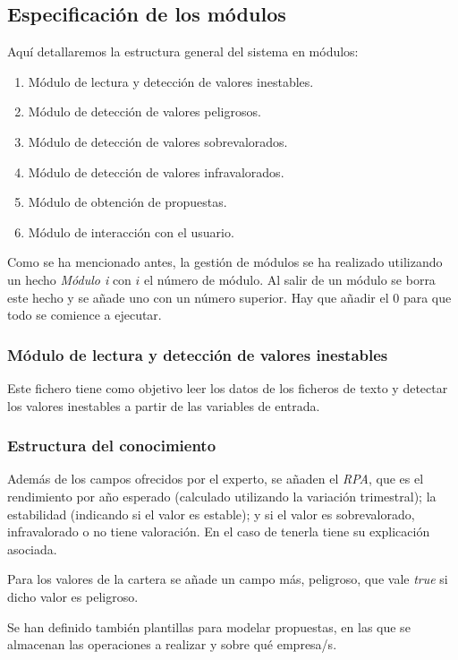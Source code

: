 \documentclass[a4paper, 11pt, titlepage]{article}
\theoremstyle{definition}
\begin{document}
  \subsection{Especificación de los módulos}
  Aquí detallaremos la estructura general del sistema en módulos:

    \begin{enumerate}\addtocounter{enumi}{-1}
        \item Módulo de lectura y detección de valores inestables.
        \item Módulo de detección de valores peligrosos.
        \item Módulo de detección de valores sobrevalorados.
        \item Módulo de detección de valores infravalorados.
        \item Módulo de obtención de propuestas.
        \item Módulo de interacción con el usuario.
    \end{enumerate}

    Como se ha mencionado antes, la gestión de módulos se ha realizado utilizando
    un hecho \emph{Módulo i} con $i$ el número de módulo. Al salir de un módulo
    se borra este hecho y se añade uno con un número superior. Hay que añadir
    el 0 para que todo se comience a ejecutar.

  \subsubsection{Módulo de lectura y detección de valores inestables}
  Este fichero tiene como objetivo leer los datos de los ficheros de texto
  y detectar los valores inestables a partir de las variables de entrada.

  \subsubsection*{Estructura del conocimiento}
  Además de los campos ofrecidos por el experto, se añaden el \emph{RPA}, que es
  el rendimiento por año esperado (calculado utilizando la variación trimestral);
  la estabilidad (indicando si el valor es estable); y si el valor es sobrevalorado,
  infravalorado o no tiene valoración. En el caso de tenerla tiene su explicación
  asociada.

  Para los valores de la cartera se añade un campo más, peligroso, que vale \emph{true}
  si dicho valor es peligroso.

  Se han definido también plantillas para modelar propuestas, en las que se
  almacenan las operaciones a realizar y sobre qué empresa/s.
\end{document}
